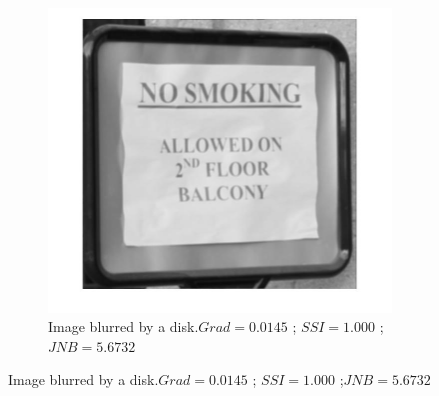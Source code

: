 \begin{figure}[h!]
\begin{subfigure}[b]{0.35\textwidth}
        \end{subfigure}
        \hspace{.6cm}
        \begin{subfigure}[b]{0.35\textwidth}
                 \centering
                 \includegraphics[width=\textwidth]{sign_D.jpg}
                 \caption{Image blurred by a disk.\newline $Grad=0.0145$ ; $SSI=1.000$ ;\newline $JNB=5.6732$}
                       

\end{subfigure}
\end{figure}
